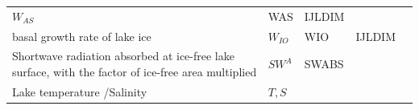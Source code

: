 \begin{longtable}[]{@{}lllll@{}}
\begin{minipage}[t]{0.08\columnwidth}
\(W_{AS}\)\strut
\end{minipage} & \begin{minipage}[t]{0.06\columnwidth}\raggedright
WAS\strut
\end{minipage} & \begin{minipage}[t]{0.13\columnwidth}\raggedright
IJLDIM\strut
\end{minipage} & \begin{minipage}[t]{0.04\columnwidth}\raggedright
\strut
\end{minipage}\tabularnewline
\begin{minipage}[t]{0.55\columnwidth}\raggedright
basal growth rate of lake ice\strut
\end{minipage} & \begin{minipage}[t]{0.08\columnwidth}\raggedright
\(W_{IO}\)\strut
\end{minipage} & \begin{minipage}[t]{0.06\columnwidth}\raggedright
WIO\strut
\end{minipage} & \begin{minipage}[t]{0.13\columnwidth}\raggedright
IJLDIM\strut
\end{minipage} & \begin{minipage}[t]{0.04\columnwidth}\raggedright
\strut
\end{minipage}\tabularnewline
\begin{minipage}[t]{0.55\columnwidth}\raggedright
Shortwave radiation absorbed at ice-free lake surface, with the factor
of ice-free area multiplied\strut
\end{minipage} & \begin{minipage}[t]{0.08\columnwidth}\raggedright
\(SW^A\)\strut
\end{minipage} & \begin{minipage}[t]{0.06\columnwidth}\raggedright
SWABS\strut
\end{minipage} & \begin{minipage}[t]{0.13\columnwidth}\raggedright
\strut
\end{minipage} & \begin{minipage}[t]{0.04\columnwidth}\raggedright
\strut
\end{minipage}\tabularnewline
\begin{minipage}[t]{0.55\columnwidth}\raggedright
Lake temperature /Salinity\strut
\end{minipage} & \begin{minipage}[t]{0.08\columnwidth}\raggedright
\(T, S\)\strut
\end{minipage} & \begin{minipage}[t]{0.06\columnwidth}\raggedright

\end{minipage}
\end{longtable}
